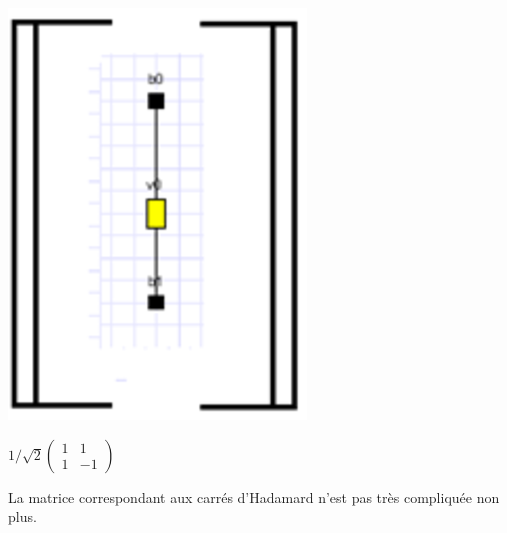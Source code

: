 \documentclass[a4paper,oneside]{book}
\begin{document}
\begin{center}
\hspace{1cm}
\begin{minipage}[c]{0.25\textwidth}
\includegraphics[scale=0.9]{IMG/hadamard.eps}
\end{minipage}
\hspace{1.5cm}
\begin{minipage}[c]{0.25\textwidth}
$
1/ \sqrt{2}
\begin{pmatrix}
1 & 1 \\
1 & -1
\end{pmatrix}
$
\end{minipage}
\label{hadamrd}
\end{center}

La matrice correspondant aux carrés d'Hadamard n'est pas très compliquée non plus.
\end{document}
